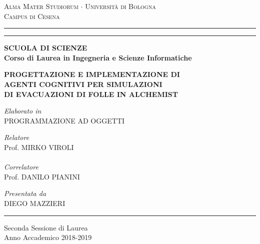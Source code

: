 \begin{center}
{{\Large{\textsc{Alma Mater Studiorum $\cdot$ Università di Bologna\\\vspace{2mm}Campus di Cesena}}}}
\rule[0.1cm]{15.8cm}{0.1mm}
\rule[0.5cm]{15.8cm}{0.5mm}
{\small{\bf{SCUOLA DI SCIENZE\\Corso di Laurea in Ingegneria e Scienze Informatiche}}}
\end{center}

\vspace{10mm}

\begin{center}
{\Large{\bf PROGETTAZIONE E IMPLEMENTAZIONE DI}}\\
\vspace{2mm}
{\Large{\bf AGENTI COGNITIVI PER SIMULAZIONI}}\\
\vspace{2mm}
{\Large{\bf DI EVACUAZIONI DI FOLLE IN ALCHEMIST}}\\
\end{center}

\vspace{8mm}

\begin{center}
{\large{{\it Elaborato in}\\\vspace{1mm}PROGRAMMAZIONE AD OGGETTI}}
\end{center}

\vspace{22mm}

\noindent
\begin{minipage}[t]{0.47\textwidth}
{\large{{\it Relatore}\\Prof. MIRKO VIROLI\\\vspace{1mm}\\{\it Correlatore}\\Prof. DANILO PIANINI}}
\end{minipage}
\hfill
\begin{minipage}[t]{0.47\textwidth}\raggedleft
{\large{{\it Presentata da}\\{DIEGO MAZZIERI}}}
\end{minipage}

\vspace{20mm}

\begin{center}
\rule[0.1cm]{15.8cm}{0.1mm}
{\large{Seconda Sessione di Laurea\\Anno Accademico 2018-2019}}
\end{center}